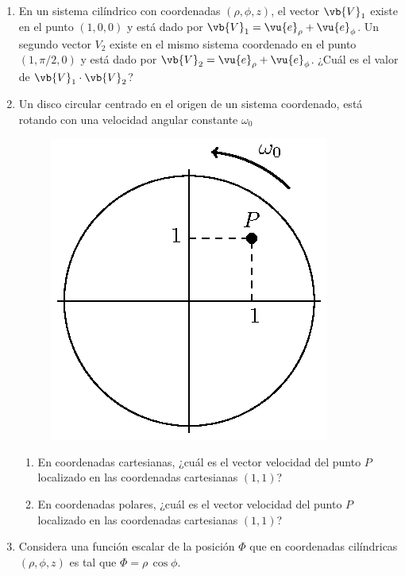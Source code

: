 \begin{enumerate}
\item En un sistema cilíndrico con coordenadas $(\rho, \phi, z)$, el vector $\vb{V}_{1}$ existe en el punto $(1,  0, 0)$ y está dado por $\vb{V}_{1} = \vu{e}_{\rho} + \vu{e}_{\phi}$. Un segundo vector $V_{2}$ existe en el mismo sistema coordenado en el punto $(1, \pi/2, 0)$ y está dado por $\vb{V}_{2} = \vu{e}_{\rho} + \vu{e}_{\phi}$. ¿Cuál es el valor de $\vb{V}_{1} \cdot \vb{V}_{2}$?
\item Un disco circular centrado en el origen de un sistema coordenado, está rotando con una velocidad angular constante $\omega_{0}$
\begin{figure}[H]
    \centering
    \includegraphics[scale=1]{Imagenes/Ejercicio_Disco_Rotando_01.eps}
\end{figure}
\begin{enumerate}[label=\alph*)]
\item En coordenadas cartesianas, ¿cuál es el vector velocidad del punto $P$ localizado en las coordenadas cartesianas $(1, 1)$?
\item En coordenadas polares, ¿cuál es el vector velocidad del punto $P$ localizado en las coordenadas cartesianas $(1, 1)$?
\end{enumerate}
\item Considera una función escalar de la posición $\Phi$ que en coordenadas cilíndricas $(\rho, \phi, z)$ es tal que $\Phi = \rho \, \cos \phi$.
\begin{enumerate}[label=\roman*)]

\end{enumerate}
\end{enumerate}
